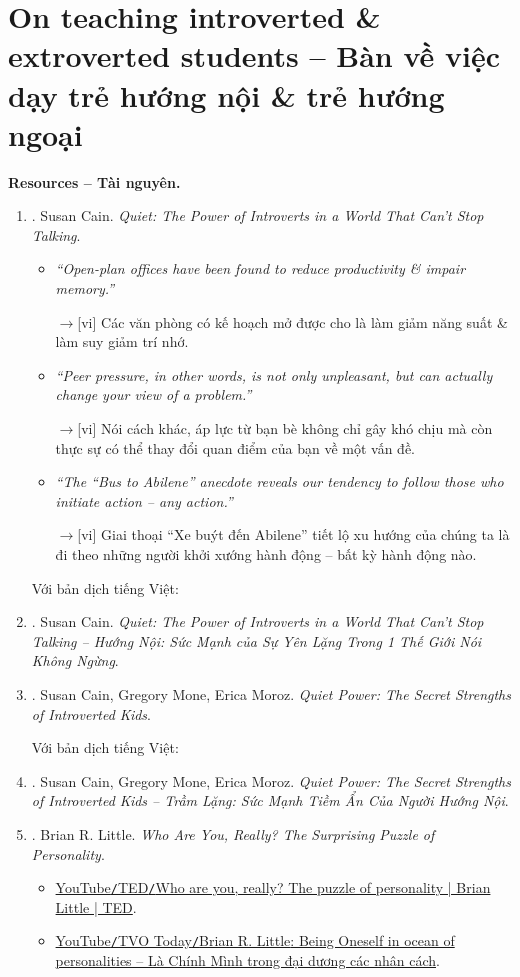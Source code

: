 \documentclass[12pt,twoside]{book}
\begin{document}
\section{On teaching introverted \& extroverted students -- Bàn về việc dạy trẻ hướng nội \& trẻ hướng ngoại}
{\bf \textsf{Resources -- Tài nguyên.}}
\begin{enumerate}
	\item \cite{Cain_quiet}. {\sc Susan Cain}. {\it Quiet: The Power of Introverts in a World That Can't Stop Talking}.
	\begin{itemize}
		\item {\it``Open-plan offices have been found to reduce productivity \& impair memory.''}
		
		{\sf[en]$\to$[vi]} Các văn phòng có kế hoạch mở được cho là làm giảm năng suất \& làm suy giảm trí nhớ.
		
		\item {\it``Peer pressure, in other words, is not only unpleasant, but can actually change your view of a problem.''}
		
		{\sf[en]$\to$[vi]} Nói cách khác, áp lực từ bạn bè không chỉ gây khó chịu mà còn thực sự có thể thay đổi quan điểm của bạn về một vấn đề.
		
		\item {\it``The ``Bus to Abilene'' anecdote reveals our tendency to follow those who initiate action -- any action.''}
		
		{\sf[en]$\to$[vi]} Giai thoại “Xe buýt đến Abilene” tiết lộ xu hướng của chúng ta là đi theo những người khởi xướng hành động -- bất kỳ hành động nào.
	\end{itemize}
	Với bản dịch tiếng Việt:
	\item \cite{Cain_quiet_VN}. {\sc Susan Cain}. {\it Quiet: The Power of Introverts in a World That Can't Stop Talking -- Hướng Nội: Sức Mạnh của Sự Yên Lặng Trong 1 Thế Giới Nói Không Ngừng}.
	\item \cite{Cain_Mone_Moroz_quiet_power}. {\sc Susan Cain, Gregory Mone, Erica Moroz}. {\it Quiet Power: The Secret Strengths of Introverted Kids}.
	
	Với bản dịch tiếng Việt:
	\item \cite{Cain_Mone_Moroz_quiet_power_VN}. {\sc Susan Cain, Gregory Mone, Erica Moroz}. {\it Quiet Power: The Secret Strengths of Introverted Kids -- Trầm Lặng: Sức Mạnh Tiềm Ẩn Của Người Hướng Nội}.
	\item \cite{Little_personality}. {\sc Brian R. Little}. {\it Who Are You, Really? The Surprising Puzzle of Personality}.
	\begin{itemize}
		\item \href{https://www.youtube.com/watch?v=qYvXk_bqlBk}{YouTube{\tt/}TED{\tt/}Who are you, really? The puzzle of personality | Brian Little | TED}.
		\item \href{https://www.youtube.com/watch?v=XGinP10Jmv8}{YouTube{\tt/}TVO Today{\tt/}{\sc Brian R. Little}: Being Oneself in ocean of personalities -- Là Chính Mình trong đại dương các nhân cách}.
		

\end{itemize}
\end{enumerate}
\end{document}
